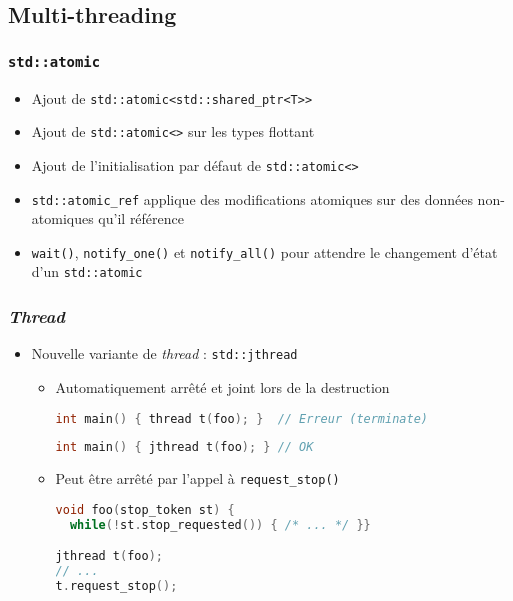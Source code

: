 \documentclass[C++.tex]{subfiles}
\begin{document}
\subsection*{Multi-threading}
\begin{frame}[fragile]
	\frametitle{\lstinline|std::atomic|}
	\begin{itemize}
		\item Ajout de \lstinline|std::atomic<std::shared_ptr<T>>|
		\item Ajout de \lstinline|std::atomic<>| sur les types flottant
		\item Ajout de l'initialisation par défaut de \lstinline|std::atomic<>|
		\item \lstinline|std::atomic_ref| applique des modifications atomiques sur des données non-atomiques qu'il référence
		\item \lstinline|wait()|, \lstinline|notify_one()| et \lstinline|notify_all()| pour attendre le changement d'état d'un \lstinline|std::atomic|
	\end{itemize}
\end{frame}

\begin{frame}[fragile]
	\frametitle{\textit{Thread}}
	\begin{itemize}
		\item Nouvelle variante de \textit{thread} : \lstinline|std::jthread|
		\begin{itemize}
			\item Automatiquement arrêté et joint lors de la destruction


\begin{lstlisting}[language=C++]
int main() { thread t(foo); }  // Erreur (terminate)\end{lstlisting}


\begin{lstlisting}[language=C++]
int main() { jthread t(foo); } // OK\end{lstlisting}

			\item Peut être arrêté par l'appel à \lstinline|request_stop()|

\begin{lstlisting}[language=C++]
void foo(stop_token st) {
  while(!st.stop_requested()) { /* ... */ }}

jthread t(foo);
// ...
t.request_stop();\end{lstlisting}
		\end{itemize}
	\end{itemize}
\end{frame}
\end{document}
